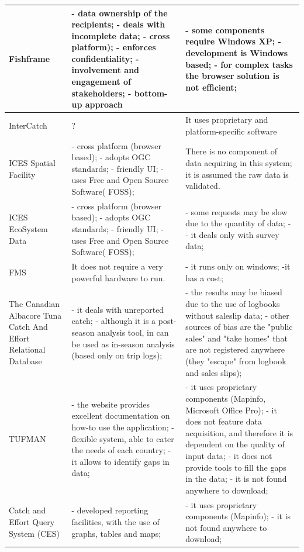 \documentclass[11pt]{article} %
\begin{document}
\begin{center}
\begin{supertabular}{ | p{0.3\textwidth} | p{0.3\textwidth} | p{0.3\textwidth} |}
Fishframe & - data ownership of the recipients; - deals with incomplete data; - cross platform); - enforces confidentiality; - involvement and engagement of stakeholders; - bottom-up approach & - some components require Windows XP; - development is Windows based; - for complex tasks the browser solution is not efficient; \\ \hline
InterCatch & ? & It uses proprietary and platform-specific software \\ \hline
ICES Spatial Facility & - cross platform (browser based); - adopts OGC standards; - friendly UI; - uses Free and Open Source Software( FOSS); & There is no component of data acquiring in this system; it is assumed the raw data is validated. \\ \hline
ICES EcoSystem Data & - cross platform (browser based); - adopts OGC standards; - friendly UI; - uses Free and Open Source Software( FOSS); & - some requests may be slow due to the quantity of data; - - it deals only with survey data; \\ \hline
FMS & It does not require a very powerful hardware to run. & - it runs only on windows; -it has a cost; \\ \hline
The Canadian Albacore Tuna Catch And Effort Relational Database & - it deals with unreported catch; - although it is a post-season analysis tool, in can be used as in-season analysis (based only on trip logs); & - the results may be biased due to the use of logbooks without saleslip data; - other sources of bias are the "public sales" and "take homes" that are not registered anywhere (they "escape" from logbook and sales slips);  \\ \hline
TUFMAN & - the website provides excellent documentation on how-to use the application; - flexible system, able to cater the needs of each country; - it allows to identify gaps in data; & - it uses proprietary components (Mapinfo, Microsoft Office Pro); - it does not feature data acquisition, and therefore it is dependent on the quality of input data; - it does not provide tools to fill the gaps in the data; - it is not found anywhere to download; \\ \hline
Catch and Effort Query System (CES) & - developed reporting facilities, with the use of graphs, tables and maps; & - it uses proprietary components (Mapinfo); - it is not found anywhere to download; \\ \hline

\end{supertabular}
\end{center}
\end{document}
